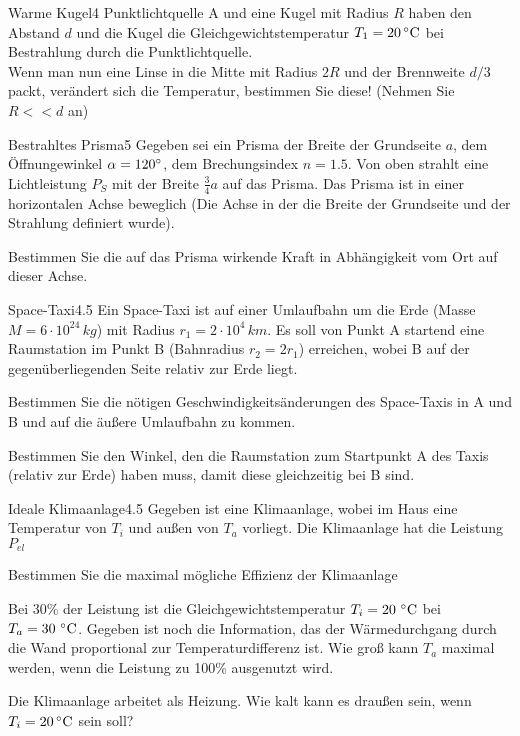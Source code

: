 


\begin{problem}{Warme Kugel}{4}
Punktlichtquelle A und eine Kugel mit Radius $R$ haben den Abstand $d$ und die Kugel die Gleichgewichtstemperatur $T_1=20\,^\circ\mathrm{C}$ bei Bestrahlung durch die Punktlichtquelle.\\
Wenn man nun eine Linse in die Mitte mit Radius $2R$ und der Brennweite $d/3$ packt, verändert sich die Temperatur, bestimmen Sie diese! (Nehmen Sie $R<<d$ an)
\end{problem}

\begin{problem}{Bestrahltes Prisma}{5}
Gegeben sei ein Prisma der Breite der Grundseite $a$, dem Öffnungewinkel $\alpha=120^\circ$, dem Brechungsindex $n=1.5$. Von oben strahlt eine Lichtleistung $P_S$ mit der Breite $\frac{3}{4} a$ auf das Prisma. Das Prisma ist in einer horizontalen Achse beweglich (Die Achse in der die Breite der Grundseite und der Strahlung definiert wurde).
\begin{abcenum}
\item Bestimmen Sie die auf das Prisma wirkende Kraft in Abhängigkeit vom Ort auf dieser Achse.
\end{abcenum}
\end{problem}

\begin{problem}{Space-Taxi}{4.5}
Ein Space-Taxi ist auf einer Umlaufbahn um die Erde (Masse $M=6\cdot 10^{24}\,kg$) mit Radius $r_1=2\cdot 10^4\,km$. Es soll von Punkt A startend eine Raumstation im Punkt B (Bahnradius $r_2=2r_1$) erreichen, wobei B auf der gegenüberliegenden Seite relativ zur Erde liegt.
\begin{abcenum}
\item Bestimmen Sie die nötigen Geschwindigkeitsänderungen des Space-Taxis in A und B und auf die äußere Umlaufbahn zu kommen.
\item Bestimmen Sie den Winkel, den die Raumstation zum Startpunkt A des Taxis (relativ zur Erde) haben muss, damit diese gleichzeitig bei B sind.
\end{abcenum}
\end{problem}

\begin{problem}{Ideale Klimaanlage}{4.5}
Gegeben ist eine Klimaanlage, wobei im Haus eine Temperatur von $T_i$ und außen von $T_a$ vorliegt. Die Klimaanlage hat die Leistung $P_{el}$
\begin{abcenum}
\item Bestimmen Sie die maximal mögliche Effizienz der Klimaanlage
\item Bei 30\% der Leistung ist die Gleichgewichtstemperatur $T_i=20\,\mathrm{\,^\circ\mathrm{C}}$ bei $T_a=30\,\mathrm{\,^\circ\mathrm{C}}$. Gegeben ist noch die Information, das der Wärmedurchgang durch die Wand proportional zur Temperaturdifferenz ist. Wie groß kann $T_a$ maximal werden, wenn die Leistung zu 100\% ausgenutzt wird.
\item Die Klimaanlage arbeitet als Heizung. Wie kalt kann es draußen sein, wenn $T_i=20\,^\circ\mathrm{C}$ sein soll?
\end{abcenum}
\end{problem}


